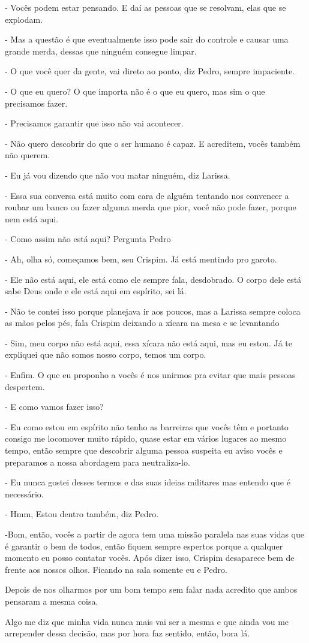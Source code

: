 - Vocês podem estar pensando. E daí as pessoas que se resolvam, elas que se explodam.

- Mas a questão é que eventualmente isso pode sair do controle e causar uma grande merda, dessas que ninguém consegue limpar.

- O que você quer da gente, vai direto ao ponto, diz Pedro, sempre impaciente.

- O que eu quero? O que importa não é o que eu quero, mas sim o que precisamos fazer.

- Precisamos garantir que isso não vai acontecer.

- Não quero descobrir do que o ser humano é capaz. E acreditem, vocês também não querem.

- Eu já vou dizendo que não vou matar ninguém, diz Larissa.

- Essa sua conversa está muito com cara de alguém tentando nos convencer a roubar um banco ou fazer alguma merda que pior, você não pode fazer, porque nem está aqui.

- Como assim não está aqui? Pergunta Pedro

- Ah, olha só, começamos bem, seu Crispim. Já está mentindo pro garoto.

- Ele não está aqui, ele está como ele sempre fala, desdobrado. O corpo dele está sabe Deus onde e ele está aqui em espírito, sei lá.

- Não te contei isso porque planejava ir aos poucos, mas a Larissa sempre coloca as mãos pelos pés, fala Crispim deixando a xícara na mesa e se levantando

- Sim, meu corpo não está aqui, essa xícara não está aqui, mas eu estou. Já te expliquei que não somos nosso corpo, temos um corpo.

- Enfim. O que eu proponho a vocês é nos unirmos pra evitar que mais pessoas despertem.

- E como vamos fazer isso?

- Eu como estou em espírito não tenho as barreiras que vocês têm e portanto consigo me locomover muito rápido, quase estar em vários lugares ao mesmo tempo, então sempre que descobrir alguma pessoa suspeita eu aviso vocês e preparamos a nossa abordagem para neutraliza-lo.

- Eu nunca gostei desses termos e das suas ideias militares mas entendo que é necessário.

- Hmm, Estou dentro também, diz Pedro.

-Bom, então, vocês a partir de agora tem uma missão paralela nas suas vidas que é garantir o bem de todos, então fiquem sempre espertos porque a qualquer momento eu posso contatar vocês. Após dizer isso, Crispim desaparece bem de frente aos nossos olhos. Ficando na sala somente eu e Pedro.

Depois de nos olharmos por um bom tempo sem falar nada acredito que ambos pensaram a mesma coisa.

Algo me diz que minha vida nunca mais vai ser a mesma e que ainda vou me arrepender dessa decisão, mas por hora faz sentido, então, bora lá.


